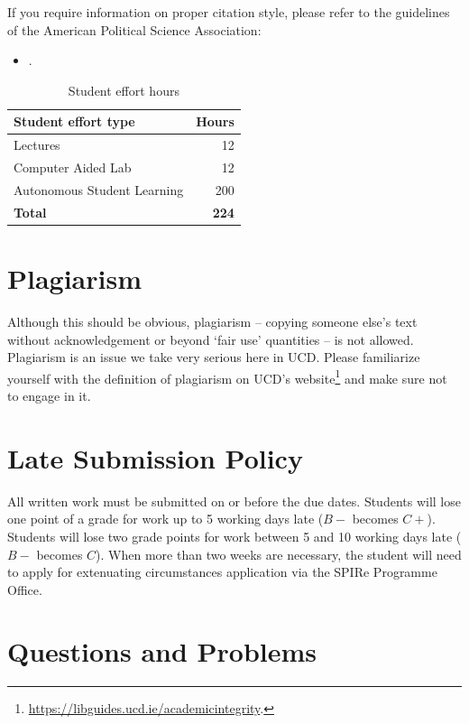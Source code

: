 \documentclass[abstract=on,parskip=full,headings=standardclasses,fontsize=11pt,paper=a4]{scrartcl}
\begin{document}
If you require information on proper citation style, please refer to the guidelines of the American Political Science Association:

\begin{itemize}
\item {}.
\end{itemize}



\begin{table}[h] \centering \onehalfspacing
\caption*{Student effort hours}
\begin{tabular}{ l r} 
\toprule
Student effort type &  Hours \\
\midrule
Lectures & 12 \\
Computer Aided Lab  & 12 \\
Autonomous Student Learning  & 200 \\
\textbf{Total} & \textbf{224} \\
\bottomrule
\end{tabular}
\end{table}


\section*{Plagiarism}

Although this should be obvious, plagiarism -- copying someone else's text without acknowledgement or beyond `fair use' quantities -- is not allowed. Plagiarism is an issue we take very serious here in UCD. Please familiarize yourself with the definition of plagiarism on UCD's website\footnote{\url{https://libguides.ucd.ie/academicintegrity}.} and make sure not to engage in it.



\section*{Late Submission Policy}

All written work must be submitted on or before the due dates. Students will lose one point of a grade for work up to 5 working days late ($B-$ becomes $C+$). Students will lose two grade points for work between 5 and 10 working days late ($B-$ becomes $C$). When more than two weeks are necessary, the student will need to apply for extenuating circumstances application via the SPIRe Programme Office.


\section*{Questions and Problems}
\end{document}
